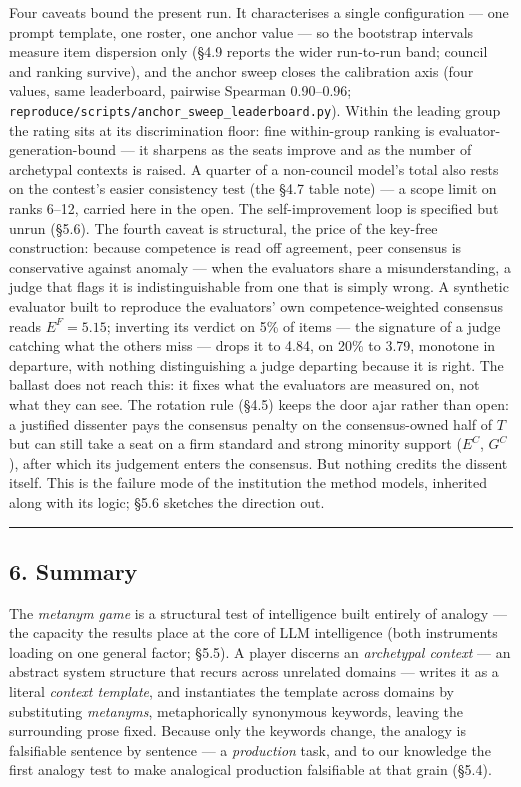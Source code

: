 Four caveats bound the present run. It characterises a single configuration --- one prompt template, one roster, one anchor value --- so the bootstrap intervals measure item dispersion only (§4.9 reports the wider run-to-run band; council and ranking survive), and the anchor sweep closes the calibration axis (four values, same leaderboard, pairwise Spearman 0.90--0.96; \texttt{reproduce/scripts/anchor\_sweep\_leaderboard.py}). Within the leading group the rating sits at its discrimination floor: fine within-group ranking is evaluator-generation-bound --- it sharpens as the seats improve and as the number of archetypal contexts is raised. A quarter of a non-council model's total also rests on the contest's easier consistency test (the §4.7 table note) --- a scope limit on ranks 6--12, carried here in the open. The self-improvement loop is specified but unrun (§5.6). The fourth caveat is structural, the price of the key-free construction: because competence is read off agreement, peer consensus is conservative against anomaly --- when the evaluators share a misunderstanding, a judge that flags it is indistinguishable from one that is simply wrong. A synthetic evaluator built to reproduce the evaluators' own competence-weighted consensus reads \(E^{F}=5.15\); inverting its verdict on 5\% of items --- the signature of a judge catching what the others miss --- drops it to 4.84, on 20\% to 3.79, monotone in departure, with nothing distinguishing a judge departing because it is right. The ballast does not reach this: it fixes what the evaluators are measured on, not what they can see. The rotation rule (§4.5) keeps the door ajar rather than open: a justified dissenter pays the consensus penalty on the consensus-owned half of \(T\) but can still take a seat on a firm standard and strong minority support (\(E^{C}\), \(G^{C}\)), after which its judgement enters the consensus. But nothing credits the dissent itself. This is the failure mode of the institution the method models, inherited along with its logic; §5.6 sketches the direction out.

\begin{center}\rule{0.5\linewidth}{0.5pt}\end{center}

\subsection{6. Summary}\label{summary}

The \emph{metanym game} is a structural test of intelligence built entirely of analogy --- the capacity the results place at the core of LLM intelligence (both instruments loading on one general factor; §5.5). A player discerns an \emph{archetypal context} --- an abstract system structure that recurs across unrelated domains --- writes it as a literal \emph{context template}, and instantiates the template across domains by substituting \emph{metanyms}, metaphorically synonymous keywords, leaving the surrounding prose fixed. Because only the keywords change, the analogy is falsifiable sentence by sentence --- a \emph{production} task, and to our knowledge the first analogy test to make analogical production falsifiable at that grain (§5.4).

